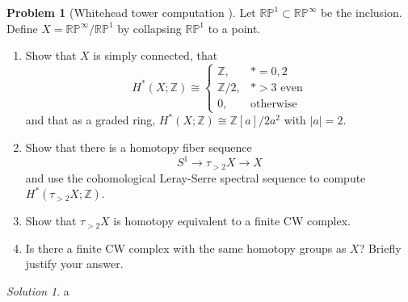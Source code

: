 \documentclass[reqno]{amsart}
\theoremstyle{definition}
\newtheorem{problem}[theorem]{Problem}
\theoremstyle{remark}
\newtheorem*{solution}{Solution}
\begin{document}
    \begin{problem}[Whitehead tower computation ]
        Let $\mathbb{R}\mathbb{P}^{1} \subset 
        \mathbb{R}\mathbb{P}^{\infty}$ be the inclusion. Define
        $X = \mathbb{R}\mathbb{P}^{\infty} / 
        \mathbb{R}\mathbb{P}^{1}$ by collapsing
        $\mathbb{R}\mathbb{P}^{1}$ to a point.
        \begin{enumerate}
            \item Show that $X$ is simply connected,
                that
                \[
                H^{*}(X;\mathbb{Z}) \cong
                \begin{cases}
                    \mathbb{Z},& *=0,2\\
                    \mathbb{Z}/2,& *>3 \text{ even}\\
                    0,& \text{otherwise}
                \end{cases}
                \] 
                and that as a graded ring,
                $H^{*}(X;\mathbb{Z}) \cong
                \mathbb{Z} \left[ a \right] / 2a^2$ with
                $\left| a \right| = 2$.
            \item Show that there is a homotopy fiber sequence
                \[
                S^{1} \to \tau_{>2}X \to X
                \] 
                and use the cohomological Leray-Serre spectral
                sequence to compute $H^{*}\left( \tau_{>2}X;
                \mathbb{Z}\right) $.
            \item Show that $\tau_{>2} X$ is homotopy equivalent
                to a finite CW complex.
            \item Is there a finite CW complex with the same
                homotopy groups as $X$? Briefly justify your
                answer.
        \end{enumerate}
    \end{problem}

    \begin{solution}
        a
    \end{solution}









\end{document}
